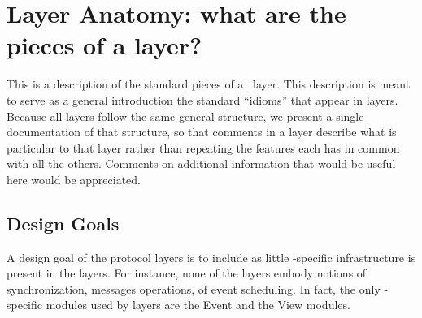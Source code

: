 \section{Layer Anatomy: what are the pieces of a layer?}

This is a description of the standard pieces of a \ensemble\ layer.  This
description is meant to serve as a general introduction the standard
``idioms'' that appear in layers.  Because all layers follow the same
general structure, we present a single documentation of that structure, so
that comments in a layer describe what is particular to that layer rather
than repeating the features each has in common with all the others.
Comments on additional information that would be useful here would be
appreciated.

\subsection{Design Goals}

A design goal of the protocol layers is to include as little
\ensemble-specific infrastructure is present in the layers.  For instance,
none of the layers embody notions of synchronization, messages operations,
of event scheduling.  In fact, the only \ensemble-specific modules used by
layers are the Event and the View modules.



